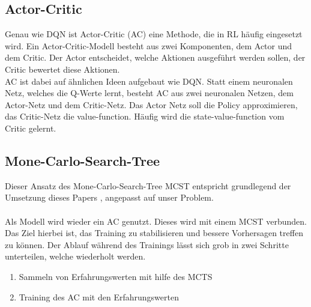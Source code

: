 \subsection{Actor-Critic}
Genau wie DQN ist Actor-Critic (AC) eine Methode, die in RL häufig eingesetzt wird.
Ein Actor-Critic-Modell besteht aus zwei Komponenten, dem Actor und dem Critic. Der Actor entscheidet, welche Aktionen ausgeführt werden sollen, der Critic bewertet diese Aktionen. 
\\
AC ist dabei auf ähnlichen Ideen aufgebaut wie DQN. Statt einem neuronalen Netz, welches die Q-Werte lernt, besteht AC aus zwei neuronalen Netzen, dem Actor-Netz und dem Critic-Netz. Das Actor Netz soll die Policy approximieren, das Critic-Netz die value-function. Häufig wird die state-value-function vom Critic gelernt. 

\subsection{Mone-Carlo-Search-Tree}
Dieser Ansatz des Mone-Carlo-Search-Tree MCST entspricht grundlegend der Umsetzung dieses Papers , angepasst auf unser Problem.
\\\\
Als Modell wird wieder ein AC genutzt. Dieses wird mit einem MCST verbunden. Das Ziel hierbei ist, das Training zu stabilisieren und bessere Vorhersagen treffen zu können. Der Ablauf während des Trainings lässt sich grob in zwei Schritte unterteilen, welche wiederholt werden.
\begin{enumerate}
	\item Sammeln von Erfahrungswerten mit hilfe des MCTS
	\item Training des AC mit den Erfahrungswerten
\end{enumerate}
